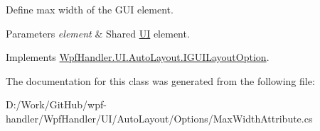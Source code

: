 Define max width of the G\+UI element. 


\begin{DoxyParams}{Parameters}
{\em element} & Shared \mbox{\hyperlink{namespace_wpf_handler_1_1_u_i}{UI}} element.\\
\hline
\end{DoxyParams}


Implements \mbox{\hyperlink{interface_wpf_handler_1_1_u_i_1_1_auto_layout_1_1_i_g_u_i_layout_option_ac2d2fa8aeaf753b3248381399f991005}{Wpf\+Handler.\+U\+I.\+Auto\+Layout.\+I\+G\+U\+I\+Layout\+Option}}.



The documentation for this class was generated from the following file\+:\begin{DoxyCompactItemize}
\item 
D\+:/\+Work/\+Git\+Hub/wpf-\/handler/\+Wpf\+Handler/\+U\+I/\+Auto\+Layout/\+Options/Max\+Width\+Attribute.\+cs\end{DoxyCompactItemize}
